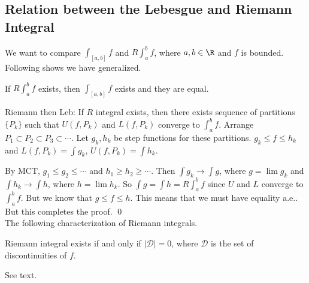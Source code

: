 






\subsection{Relation between the Lebesgue and Riemann Integral}

We want to compare $\int_{[a,b]} f$ and $R\!\!\int_a^b f$, where $a,b \in \R$ and $f$ is bounded. Following shows we have generalized.


\begin{thm}
If $R\!\!\int_a^b f$ exists, then $\int_{[a,b]} f$ exists and they are equal.
\end{thm}

\pf 
Riemann then Leb: If $R$ integral exists, then there exists sequence of partitions $\{P_k\}$ such that $U(f,P_k)$ and $L(f,P_k)$ converge to $\int_a^b f$. Arrange $P_1 \subset P_2 \subset P_3 \subset \cdots$. Let $g_k, h_k$ be step functions for these partitions. $g_k \leq f \leq h_k$ and $L(f,P_k)= \int g_k$, $U(f,P_k)= \int h_k$. 


By MCT, $g_1 \leq g_2 \leq \cdots$ and $h_1 \geq h_2 \geq \cdots$. Then $\int g_k \to \int g$, where $g= \lim g_k$ and $\int h_k \to \int h$, where $h= \lim h_k$. So $\int g = \int h = R\!\!\int_a^b f$ since $U$ and $L$ converge to $\int_a^b f$. But we know that $g \leq f \leq h$. This means that we must have equality a.e.. But this completes the proof. \qed \\






The following characterization of Riemann integrals.

\begin{thm}
Riemann integral exists if and only if $|\mathcal{D}|=0$, where $\mathcal{D}$ is the set of discontinuities of $f$. 
\end{thm}

\pf See text. 





